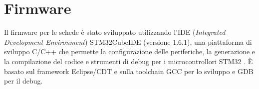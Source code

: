 \section{Firmware}
Il firmware per le schede è stato sviluppato utilizzando l'IDE (\textit{Integrated Development Environment}) STM32CubeIDE (versione 1.6.1), una piattaforma di sviluppo C/C++ che permette la configurazione delle periferiche, la generazione e la compilazione del codice e strumenti di debug per i microcontrollori STM32 \cite{STMicroelectronicsSTM32CubeIDE}. \`E basato sul framework Eclipse\textregistered/CDT e sulla toolchain GCC per lo sviluppo e GDB per il debug.

\pagebreak